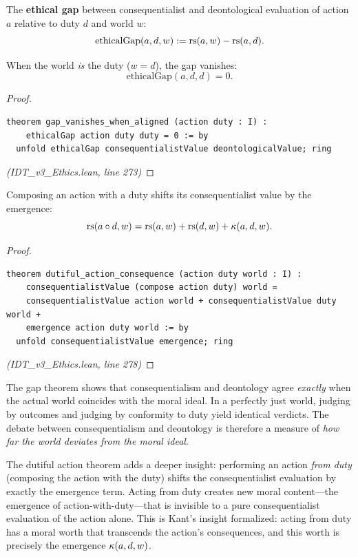 \begin{definition}
\label{def:ethical-gap}
The \textbf{ethical gap} between consequentialist and deontological
evaluation of action $a$ relative to duty $d$ and world $w$:
\[
  \mathrm{ethicalGap}(a, d, w) := \mathrm{rs}(a, w) - \mathrm{rs}(a, d).
\]
\end{definition}

\begin{theorem}
\label{thm:gap-vanishes}
When the world \emph{is} the duty ($w = d$), the gap vanishes:
\[
  \mathrm{ethicalGap}(a, d, d) = 0.
\]
\end{theorem}

\begin{proof}
\begin{lstlisting}
theorem gap_vanishes_when_aligned (action duty : I) :
    ethicalGap action duty duty = 0 := by
  unfold ethicalGap consequentialistValue deontologicalValue; ring
\end{lstlisting}
\textit{(IDT\_v3\_Ethics.lean, line 273)}
\end{proof}

\begin{theorem}
\label{thm:dutiful-action}
Composing an action with a duty shifts its consequentialist value by the
emergence:
\[
  \mathrm{rs}(a \circ d, w) = \mathrm{rs}(a, w) + \mathrm{rs}(d, w) + \kappa(a, d, w).
\]
\end{theorem}

\begin{proof}
\begin{lstlisting}
theorem dutiful_action_consequence (action duty world : I) :
    consequentialistValue (compose action duty) world =
    consequentialistValue action world + consequentialistValue duty world +
    emergence action duty world := by
  unfold consequentialistValue emergence; ring
\end{lstlisting}
\textit{(IDT\_v3\_Ethics.lean, line 278)}
\end{proof}

\begin{interpretation}
The gap theorem shows that consequentialism and deontology agree
\emph{exactly} when the actual world coincides with the moral ideal.
In a perfectly just world, judging by outcomes and judging by conformity
to duty yield identical verdicts. The debate between consequentialism and
deontology is therefore a measure of \emph{how far the world deviates from
the moral ideal}.

The dutiful action theorem adds a deeper insight: performing an action
\emph{from duty} (composing the action with the duty) shifts the
consequentialist evaluation by exactly the emergence term. Acting from
duty creates new moral content---the emergence of action-with-duty---that
is invisible to a pure consequentialist evaluation of the action alone.
This is Kant's insight formalized: acting from duty has a moral worth
that transcends the action's consequences, and this worth is precisely
the emergence $\kappa(a, d, w)$.
\end{interpretation}

